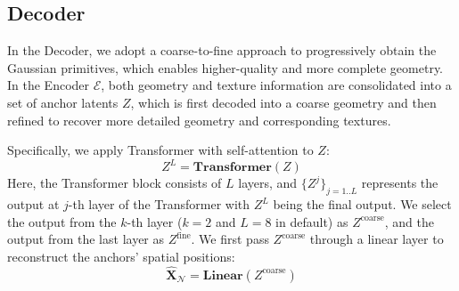 \subsection{Decoder}
\label{sec:dec}
In the Decoder, we adopt a coarse-to-fine approach to progressively obtain the Gaussian primitives, which enables higher-quality and more complete geometry. In the Encoder $\mathcal{E}$, both geometry and texture information are consolidated into a set of anchor latents \( Z \), which is first decoded into a coarse geometry and then refined to recover more detailed geometry and corresponding textures.

Specifically, we apply Transformer with self-attention to \( Z \):
\begin{equation}
    Z^L = \textbf{Transformer}(Z)
\end{equation}
Here, the Transformer block consists of \( L \) layers, and \( \{ Z^j \}_{j=1..L} \) represents the output at $j$-th layer of the Transformer with $Z^L$ being the final output.  We select the output from the \( k \)-th layer ($k=2$ and $L=8$ in default) as \( Z^{\text{coarse}} \), and the output from the last layer as \( Z^{\text{fine}} \). We first pass \( Z^{\text{coarse}} \) through a linear layer to reconstruct the anchors' spatial positions:
\[
\hat{\mathbf{X}}_\mathcal{N}
 = \textbf{Linear}(Z^{\text{coarse}})
\]


